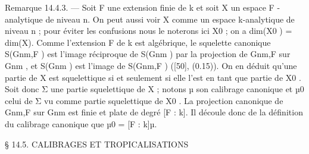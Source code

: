\documentclass[
  10pt,
]{article}
\newenvironment{Shaded}{}{}
\newcommand{\NormalTok}[1]{#1}
\begin{document}
\begin{Shaded}
\begin{Highlighting}[]
\NormalTok{Remarque 14.4.3. — Soit F une extension finie de k et soit X un espace F {-}analytique}
\NormalTok{de niveau n. On peut aussi voir X comme un espace k{-}analytique de niveau n ; pour}
\NormalTok{éviter les confusions nous le noterons ici X0 ; on a dim(X0 ) = dim(X).}
\NormalTok{   Comme l’extension F de k est algébrique, le squelette canonique S(Gnm,F ) est l’image}
\NormalTok{réciproque de S(Gnm ) par la projection de Gnm,F sur Gnm , et S(Gnm ) est l’image de S(Gnm,F )}
\NormalTok{([50], (0.15)). On en déduit qu’une partie de X est squelettique si et seulement si elle}
\NormalTok{l’est en tant que partie de X0 .}
\NormalTok{   Soit donc Σ une partie squelettique de X ; notons µ son calibrage canonique et µ0 celui}
\NormalTok{de Σ vu comme partie squelettique de X0 . La projection canonique de Gnm,F sur Gnm est}
\NormalTok{finie et plate de degré [F : k]. Il découle donc de la définition du calibrage canonique}
\NormalTok{que µ0 = [F : k]µ.}



\NormalTok{                § 14.5. CALIBRAGES ET TROPICALISATIONS}


\end{Highlighting}
\end{Shaded}
\end{document}
